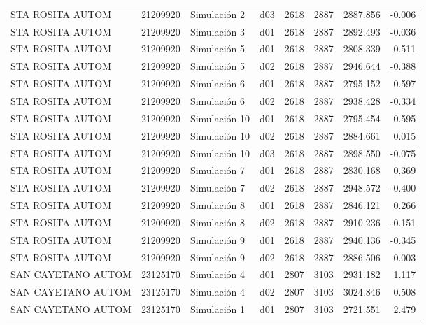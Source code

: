 \begin{landscape}
\begin{longtable}{lrlp{2cm}p{2cm}p{3cm}p{2cm}r}
        STA ROSITA AUTOM &  21209920 &   Simulación 2 &   d03 &      2618 &     2887 &  2887.856 &    -0.006 \\
        STA ROSITA AUTOM &  21209920 &   Simulación 3 &   d01 &      2618 &     2887 &  2892.493 &    -0.036 \\
        STA ROSITA AUTOM &  21209920 &   Simulación 5 &   d01 &      2618 &     2887 &  2808.339 &     0.511 \\
        STA ROSITA AUTOM &  21209920 &   Simulación 5 &   d02 &      2618 &     2887 &  2946.644 &    -0.388 \\
        STA ROSITA AUTOM &  21209920 &   Simulación 6 &   d01 &      2618 &     2887 &  2795.152 &     0.597 \\
        STA ROSITA AUTOM &  21209920 &   Simulación 6 &   d02 &      2618 &     2887 &  2938.428 &    -0.334 \\
        STA ROSITA AUTOM &  21209920 &  Simulación 10 &   d01 &      2618 &     2887 &  2795.454 &     0.595 \\
        STA ROSITA AUTOM &  21209920 &  Simulación 10 &   d02 &      2618 &     2887 &  2884.661 &     0.015 \\
        STA ROSITA AUTOM &  21209920 &  Simulación 10 &   d03 &      2618 &     2887 &  2898.550 &    -0.075 \\
        STA ROSITA AUTOM &  21209920 &   Simulación 7 &   d01 &      2618 &     2887 &  2830.168 &     0.369 \\
        STA ROSITA AUTOM &  21209920 &   Simulación 7 &   d02 &      2618 &     2887 &  2948.572 &    -0.400 \\
        STA ROSITA AUTOM &  21209920 &   Simulación 8 &   d01 &      2618 &     2887 &  2846.121 &     0.266 \\
        STA ROSITA AUTOM &  21209920 &   Simulación 8 &   d02 &      2618 &     2887 &  2910.236 &    -0.151 \\
        STA ROSITA AUTOM &  21209920 &   Simulación 9 &   d01 &      2618 &     2887 &  2940.136 &    -0.345 \\
        STA ROSITA AUTOM &  21209920 &   Simulación 9 &   d02 &      2618 &     2887 &  2886.506 &     0.003 \\
      SAN CAYETANO AUTOM &  23125170 &   Simulación 4 &   d01 &      2807 &     3103 &  2931.182 &     1.117 \\
      SAN CAYETANO AUTOM &  23125170 &   Simulación 4 &   d02 &      2807 &     3103 &  3024.846 &     0.508 \\
      SAN CAYETANO AUTOM &  23125170 &   Simulación 1 &   d01 &      2807 &     3103 &  2721.551 &     2.479 \\

\end{longtable}
\end{landscape}
